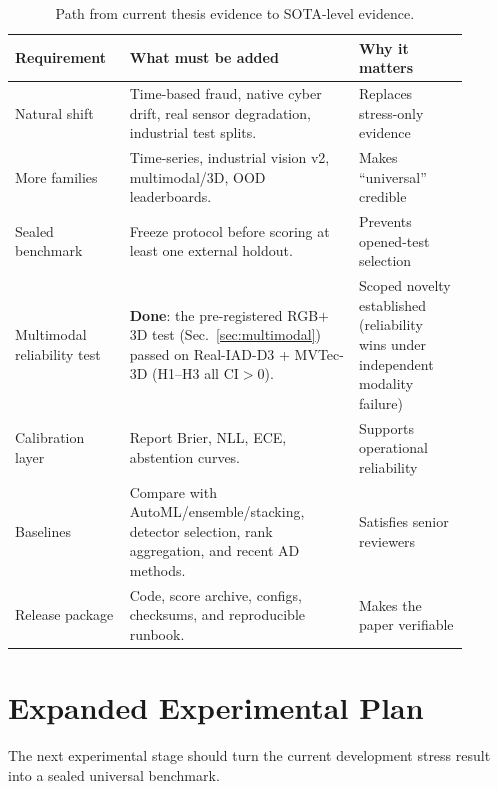 \documentclass[11pt,titlepage]{article}
\begin{document}
\begin{table}[H]
\centering
\caption{Path from current thesis evidence to SOTA-level evidence.}
\label{tab:sota-path}
\small
\begin{tabular}{L{0.22\linewidth}L{0.46\linewidth}L{0.22\linewidth}}
\toprule
\textbf{Requirement} & \textbf{What must be added} & \textbf{Why it matters} \\
\midrule
Natural shift & Time-based fraud, native cyber drift, real sensor degradation, industrial test splits. & Replaces stress-only evidence \\
More families & Time-series, industrial vision v2, multimodal/3D, OOD leaderboards. & Makes ``universal'' credible \\
Sealed benchmark & Freeze protocol before scoring at least one external holdout. & Prevents opened-test selection \\
Multimodal reliability test & \textbf{Done}: the pre-registered RGB$+$3D test (Sec.~\ref{sec:multimodal}) passed on Real-IAD-D3 + MVTec-3D (H1--H3 all CI$>$0). & Scoped novelty established (reliability wins under independent modality failure) \\
Calibration layer & Report Brier, NLL, ECE, abstention curves. & Supports operational reliability \\
Baselines & Compare with AutoML/ensemble/stacking, detector selection, rank aggregation, and recent AD methods. & Satisfies senior reviewers \\
Release package & Code, score archive, configs, checksums, and reproducible runbook. & Makes the paper verifiable \\
\bottomrule
\end{tabular}
\end{table}

\section{Expanded Experimental Plan}

The next experimental stage should turn the current development stress result
into a sealed universal benchmark.
\end{document}
